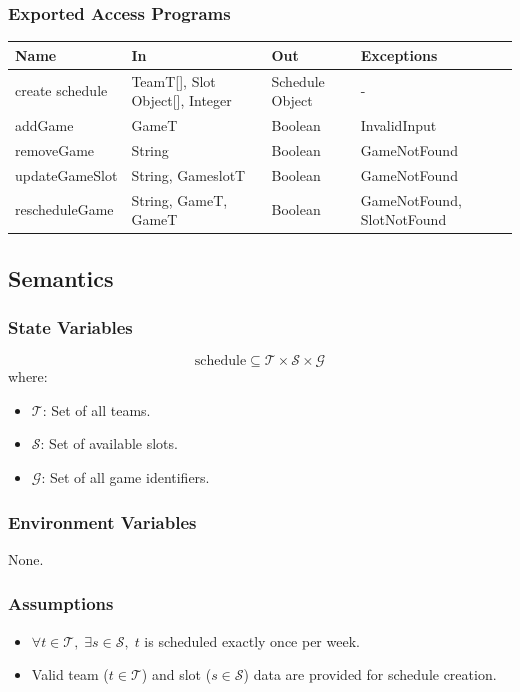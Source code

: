 \documentclass[12pt, titlepage]{article}
\begin{document}
\subsubsection{Exported Access Programs}
\begin{center}
  \begin{tabular}{|p{4cm}| p{4cm}| p{4cm} | p{3cm}|}
    \hline
    \textbf{Name}   & \textbf{In}                     & \textbf{Out}    & \textbf{Exceptions}        \\
    \hline
    create schedule & TeamT[], Slot Object[], Integer & Schedule Object & -                          \\
    addGame         & GameT                           & Boolean         & InvalidInput               \\
    removeGame      & String                          & Boolean         & GameNotFound               \\
    updateGameSlot  & String, GameslotT               & Boolean         & GameNotFound               \\
    rescheduleGame  & String, GameT, GameT            & Boolean         & GameNotFound, SlotNotFound \\
    \hline
  \end{tabular}
\end{center}

\subsection{Semantics}

\subsubsection{State Variables}
\[
  \text{schedule} \subseteq \mathcal{T} \times \mathcal{S} \times \mathcal{G}
\]
where:
\begin{itemize}
  \item \(\mathcal{T}\): Set of all teams.
  \item \(\mathcal{S}\): Set of available slots.
  \item \(\mathcal{G}\): Set of all game identifiers.
\end{itemize}

\subsubsection{Environment Variables}
None.

\subsubsection{Assumptions}
\begin{itemize}
  \item \( \forall t \in \mathcal{T}, \; \exists s \in \mathcal{S}, \; t\) is scheduled exactly once per week.
  \item Valid team (\(t \in \mathcal{T}\)) and slot (\(s \in \mathcal{S}\)) data are provided for schedule creation.
\end{itemize}
\end{document}
